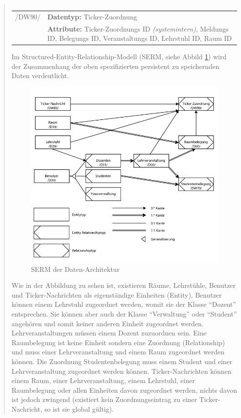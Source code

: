 \begin{quote}
\begin{tabular}{p{1.5cm}p{14.5cm}}
\end{tabular}

\begin{tabular}{p{1.5cm}p{14.5cm}}
					
	 /DW90/& \textbf{Datentyp:} Ticker-Zuordnung \\
				& \textbf{Attribute:} Ticker-Zuordnungs ID \textsl{(systemintern)}, Meldungs ID, Belegungs ID, Veranstaltungs ID, Lehrstuhl ID, Raum ID \\[0.25cm]
		
\end{tabular}


Im Structured-Entity-Relationship-Modell (SERM, siehe Abbild \ref{fig:dbserm}) wird der Zusammenhang der oben spezifizierten persistent zu speichernden Daten verdeutlicht. \\

\begin{figure}[H]
\includegraphics[scale=0.70]{./images/section_5/dbserm}
\caption{SERM der Daten-Architektur}
\label{fig:dbserm}
\end{figure}

Wie in der Abbildung zu sehen ist, existieren Räume, Lehrstühle, Benutzer und Ticker-Nachrichten als eigenständige Einheiten (Entity). Benutzer können einem Lehrstuhl zugeordnet werden, womit sie der Klasse "`Dozent"' entsprechen. Sie können aber auch der Klasse "`Verwaltung"' oder "`Student"' angehören und somit keiner anderen Einheit zugeordnet werden. Lehrveranstaltungen müssen einem Dozent zuzuordnen sein. Eine Raumbelegung ist keine Einheit sondern eine Zuordnung (Relationship) und muss einer Lehrveranstaltung und einem Raum zugeordnet werden können. Die Zuordnung Studentenbelegung muss einem Student und einer Lehrveranstaltung zugeordnet werden können. Ticker-Nachrichten können einem Raum, einer Lehrveranstaltung, einem Lehrstuhl, einer Raumbelegung oder allen Einheiten davon zugeordnet werden, nichts davon ist jedoch zwingend (existiert kein Zuordnungseintrag zu einer Ticker-Nachricht, so ist sie global gültig). \\


\end{quote}